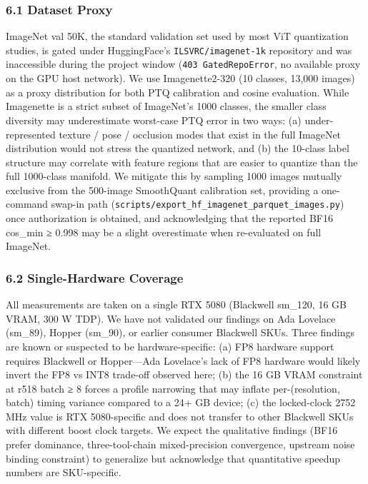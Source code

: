 \documentclass[
]{article}
\begin{document}
\subsubsection{6.1 Dataset Proxy}\label{dataset-proxy}

ImageNet val 50K, the standard validation set used by most ViT
quantization studies, is gated under HuggingFace's
\texttt{ILSVRC/imagenet-1k} repository and was inaccessible during the
project window (\texttt{403\ GatedRepoError}, no available proxy on the
GPU host network). We use Imagenette2-320 (10 classes, 13,000 images) as
a proxy distribution for both PTQ calibration and cosine evaluation.
While Imagenette is a strict subset of ImageNet's 1000 classes, the
smaller class diversity may underestimate worst-case PTQ error in two
ways: (a) under-represented texture / pose / occlusion modes that exist
in the full ImageNet distribution would not stress the quantized
network, and (b) the 10-class label structure may correlate with feature
regions that are easier to quantize than the full 1000-class manifold.
We mitigate this by sampling 1000 images mutually exclusive from the
500-image SmoothQuant calibration set, providing a one-command swap-in
path (\texttt{scripts/export\_hf\_imagenet\_parquet\_images.py}) once
authorization is obtained, and acknowledging that the reported BF16
cos\_min ≥ 0.998 may be a slight overestimate when re-evaluated on full
ImageNet.

\subsubsection{6.2 Single-Hardware
Coverage}\label{single-hardware-coverage}

All measurements are taken on a single RTX 5080 (Blackwell sm\_120, 16
GB VRAM, 300 W TDP). We have not validated our findings on Ada Lovelace
(sm\_89), Hopper (sm\_90), or earlier consumer Blackwell SKUs. Three
findings are known or suspected to be hardware-specific: (a) FP8
hardware support requires Blackwell or Hopper---Ada Lovelace's lack of
FP8 hardware would likely invert the FP8 vs INT8 trade-off observed
here; (b) the 16 GB VRAM constraint at r518 batch ≥ 8 forces a profile
narrowing that may inflate per-(resolution, batch) timing variance
compared to a 24+ GB device; (c) the locked-clock 2752 MHz value is RTX
5080-specific and does not transfer to other Blackwell SKUs with
different boost clock targets. We expect the qualitative findings (BF16
prefer dominance, three-tool-chain mixed-precision convergence, upstream
noise binding constraint) to generalize but acknowledge that
quantitative speedup numbers are SKU-specific.
\end{document}

